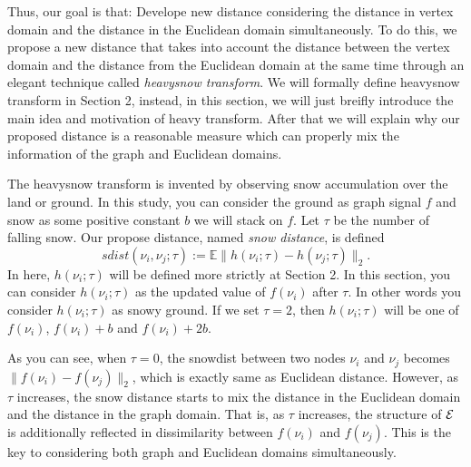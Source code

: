 \documentclass[preprint, review, 12pt]{article}
\theoremstyle{definition}
\theoremstyle{remark}
\begin{document}
Thus, our goal is that: Develope new distance considering the distance in vertex domain and the distance in the Euclidean domain simultaneously. To do this, we propose a new distance that takes into account the distance between the vertex domain and the distance from the Euclidean domain at the same time through an elegant technique called \emph{heavysnow transform}. We will formally define heavysnow transform in Section 2, instead, in this section, we will just breifly introduce the main idea and motivation of heavy transform. After that we will explain why our proposed distance is a reasonable measure which can properly mix the information of the graph and Euclidean domains. 

The heavysnow transform is invented by observing snow accumulation over the land or ground. In this study, you can consider the ground as graph signal $f$ and snow as some positive constant $b$ we will stack on $f$. Let $\tau$ be the number of falling snow. Our propose distance, named \emph{snow distance}, is defined 
\[
sdist(\nu_i,\nu_j; \tau):=\mathbb{E}\| h(\nu_i; \tau )- h(\nu_j;\tau)\|_2.
\]
In here, $h(\nu_i;\tau)$ will be defined more strictly at Section 2. In this section, you can consider $h(\nu_i;\tau)$ as the updated value of $f(\nu_i)$ after $\tau$. In other words you consider $h(\nu_i;\tau)$ as snowy ground. If we set $\tau=2$, then $h(\nu_i;\tau)$ will be one of $f(\nu_i)$, $f(\nu_i)+b$ and $f(\nu_i)+2b$. 

As you can see, when $\tau = 0$, the snowdist between two nodes $\nu_i$ and $\nu_j$ becomes $\|f(\nu_i)-f(\nu_j)\|_2$, which is exactly same as Euclidean distance. However, as $\tau$ increases, the snow distance starts to mix the distance in the Euclidean domain and the distance in the graph domain. That is, as $\tau$ increases, the structure of ${\cal E}$ is additionally reflected in dissimilarity between $f(\nu_i)$ and $f(\nu_j)$. This is the key to considering both graph and Euclidean domains simultaneously. 
\end{document}
